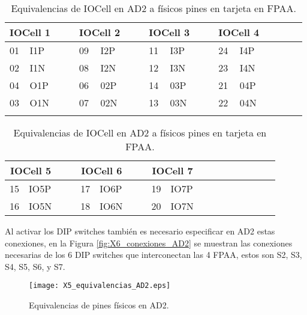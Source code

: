 	\begin{table}[!ht]                                      
		\centering   
		\caption{Equivalencias de IOCell en AD2 a físicos pines en tarjeta en FPAA.}                            
		\label{tab:IOresumen}                                        
			\begin{tabular}{ll cc ll cc ll cc ll cc ll}                        
			\hline                                              
			\multicolumn{2}{c}{IOCell 1} &&& \multicolumn{2}{c}{IOCell 2} &&& \multicolumn{2}{c}{IOCell 3}	&&& \multicolumn{2}{c}{IOCell 4}\\            
			\hline                                              
			01	& I1P	&&&	09	& I2P	&&&	11	& I3P	&&&	24	& I4P	\\  
			02	& I1N	&&&	08	& I2N	&&&	12	& I3N	&&&	23	& I4N	\\
			04	& O1P	&&&	06	& 02P	&&&	14	& 03P	&&&	21	& 04P	\\
			03	& O1N	&&&	07	& 02N	&&&	13	& 03N	&&&	22	& 04N	\\
			\hline
				&&&&&&&&&&&&& 	\\                                 
			\end{tabular}
		
			\begin{tabular}{ll cc ll cc ll cc ll cc ll}                        
			\hline                                              
			\multicolumn{2}{c}{IOCell 5} &&& \multicolumn{2}{c}{IOCell 6} &&& \multicolumn{2}{c}{IOCell 7}	\\            
			\hline                                              
			15	& IO5P	&&&	17	& IO6P	&&&	19	& IO7P	\\  
			16	& IO5N	&&&	18	& IO6N	&&&	20	& IO7N	\\
			\hline                                 
			\end{tabular}                                                             
	\end{table}
	
	Al activar los DIP switches también es necesario especificar en AD2 estas conexiones, en la Figura \ref{fig:X6_conexiones_AD2} se muestran las conexiones necesarias de los 6 DIP switches que interconectan las 4 FPAA, estos son S2, S3, S4, S5, S6, y S7.
	
	
	\begin{figure}[!h]
		\caption{Equivalencias de pines físicos en AD2.}
		\label{fig:X5_equivalencias_AD2}
		\centering
		\texttt{[image: X5\_equivalencias\_AD2.eps]}
	\end{figure}
	
